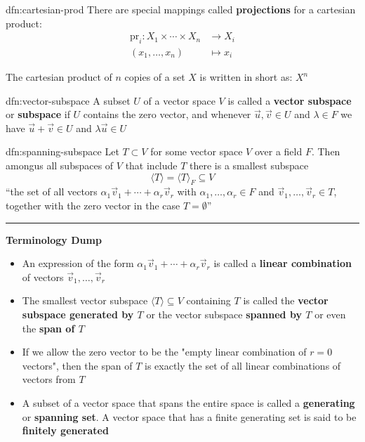\documentclass[landscape, 8pt]{extarticle}
\begin{document}
\begin{multicols}{3}
\begin{dfn}{dfn:cartesian-prod}{}
    There are special mappings called \textbf{projections} for a cartesian product:
    \begin{align*}
        \text{pr}_{i} : X_{1} \times \cdots \times X_{n} &\to X_{i}\\
        (x_{1},\dots,x_{n}) &\mapsto x_{i}
    \end{align*}

    The cartesian product of $n$ copies of a set $X$ is written in short as: $X^{n}$
\end{dfn}

\begin{dfn}{dfn:vector-subspace}{}
    A subset $U$ of a vector space $V$ is called a \textbf{vector subspace} or \textbf{subspace} if $U$ contains the zero vector, and whenever $\vec{u},\vec{v}\in U$ and $\lambda\in F$ we have $\vec{u} + \vec{v}\in U$ and $\lambda \vec{u}\in U$
\end{dfn}

\begin{dfn}{dfn:spanning-subspace}{}
    Let $T \subset V$ for some vector space $V$ over a field $F$. Then amongus all subspaces of $V$ that include $T$ there is a smallest subspace
    \[\langle T \rangle = \langle T \rangle_{F} \subseteq V\]
    ``the set of all vectors $\alpha_{1}\vec{v}_{1} + \cdots + \alpha_{r}\vec{v}_{r}$ with $\alpha_{1},\dots,\alpha_{r}\in F$ and $\vec{v}_{1},\dots,\vec{v}_{r}\in T$, together with the zero vector in the case $T = \emptyset$''

    \noindent\rule{\textwidth}{0.2pt}

    \textbf{Terminology Dump}
    \begin{itemize}
        \setlength\itemsep{0em}
        \item An expression of the form $\alpha_{1}\vec{v}_{1}+\cdots+\alpha_{r}\vec{v}_{r}$ is called a \textbf{linear combination} of vectors $\vec{v}_{1},\dots,\vec{v}_{r}$
        \item The smallest vector subspace $\langle T \rangle \subseteq V$ containing $T$ is called the \textbf{vector subspace generated by $T$} or the vector subspace \textbf{spanned by $T$} or even the \textbf{span of $T$}
        \item If we allow the zero vector to be the "empty linear combination of $r = 0$ vectors", then the span of $T$ is exactly the set of all linear combinations of vectors from $T$ 
        \item A subset of a vector space that spans the entire space is called a \textbf{generating} or \textbf{spanning set}. A vector space that has a finite generating set is said to be \textbf{finitely generated}
    \end{itemize}


\end{dfn}
\end{multicols}
\end{document}
